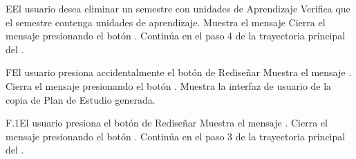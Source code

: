 \begin{UCtrayectoriaA}{E}{El usuario desea eliminar un semestre con unidades de Aprendizaje}
	\UCpaso Verifica que el semestre contenga unidades de aprendizaje.
	\UCpaso Muestra el mensaje 
	\UCpaso[\UCactor] Cierra el mensaje presionando el botón .
	\UCpaso Continúa en el paso 4 de la trayectoria principal del .
\end{UCtrayectoriaA}

\begin{UCtrayectoriaA}{F}{El usuario presiona accidentalmente el botón  de Rediseñar}
	\UCpaso  Muestra el mensaje .
	\UCpaso[\UCactor] Cierra el mensaje presionando el botón .
	\UCpaso Muestra la interfaz de usuario  de la copia de Plan de Estudio generada.
\end{UCtrayectoriaA}
\begin{UCtrayectoriaA}{F.1}{El usuario presiona el botón  de Rediseñar}
	\UCpaso  Muestra el mensaje .
	\UCpaso[\UCactor] Cierra el mensaje presionando el botón .
	\UCpaso Continúa en el paso 3 de la trayectoria principal del .
\end{UCtrayectoriaA}

